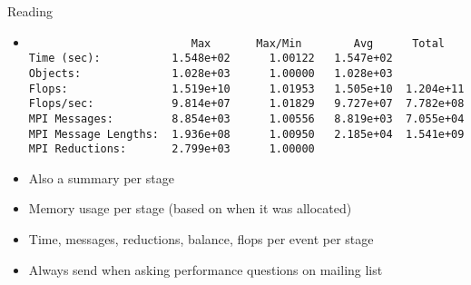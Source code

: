 \begin{frame}[fragile]{Reading }
\begin{itemize}
\item
{\scriptsize
\begin{verbatim}
                         Max       Max/Min        Avg      Total 
Time (sec):           1.548e+02      1.00122   1.547e+02
Objects:              1.028e+03      1.00000   1.028e+03
Flops:                1.519e+10      1.01953   1.505e+10  1.204e+11
Flops/sec:            9.814e+07      1.01829   9.727e+07  7.782e+08
MPI Messages:         8.854e+03      1.00556   8.819e+03  7.055e+04
MPI Message Lengths:  1.936e+08      1.00950   2.185e+04  1.541e+09
MPI Reductions:       2.799e+03      1.00000
\end{verbatim}}
\item Also a summary per stage
\item Memory usage per stage (based on when it was allocated)
\item Time, messages, reductions, balance, flops per event per stage
\item Always send  when asking performance questions on
  mailing list
\end{itemize}
\end{frame}

